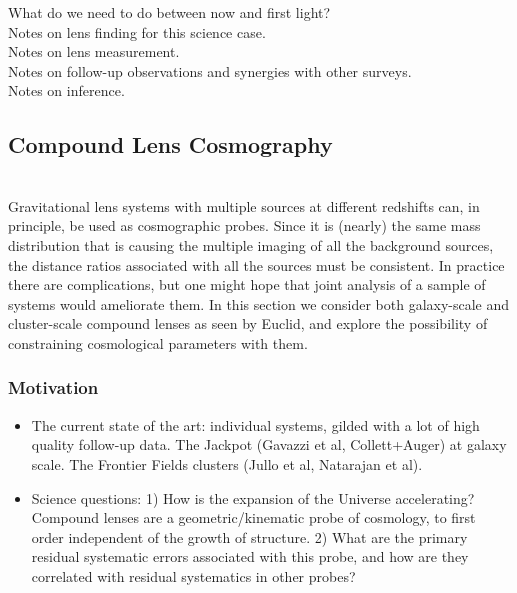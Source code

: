 \documentclass[twocolumn]{svjour3}
\begin{document}
What do we need to do between now and first light?\\

Notes on lens finding for this science case.\\

Notes on lens measurement.\\

Notes on follow-up observations and synergies with other surveys.\\

Notes on inference.\\



\subsection{Compound Lens Cosmography}


\\

Gravitational lens systems with multiple sources at different redshifts can, in principle, be used as cosmographic probes. Since it is (nearly) the same mass distribution that is causing the multiple imaging of all the background sources, the distance ratios associated with all the sources must be consistent. In practice there are complications, but one might hope that joint analysis of a sample of systems would ameliorate them. In this section we consider both galaxy-scale and cluster-scale compound lenses as seen by Euclid, and explore the possibility of constraining cosmological parameters with them.

\subsubsection{Motivation}

\begin{itemize}
\item The current state of the art: individual systems, gilded with a lot of high quality follow-up data. The Jackpot (Gavazzi et al, Collett+Auger) at galaxy scale. The Frontier Fields clusters (Jullo et al, Natarajan et al).
\item Science questions: 1) How is the expansion of the Universe accelerating? Compound lenses are a geometric/kinematic probe of cosmology, to first order independent of the growth of structure. 2) What are the primary residual systematic errors associated with this probe, and how are they correlated with residual systematics in other probes?
\end{itemize}
\end{document}
